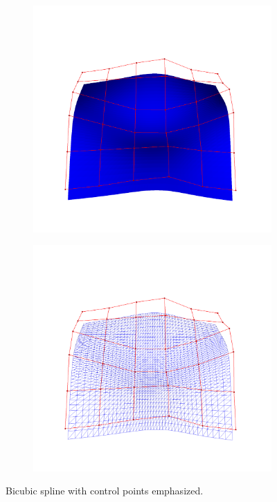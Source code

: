 \begin{figure}
    \centering
    \begin{subfigure}[b]{0.49\textwidth}
        \centering
        \includegraphics[height=\textwidth, trim=90 90 90 90, clip]{figures/registration/splines/spline2.png}
    \end{subfigure}

    \begin{subfigure}[b]{0.49\textwidth}
        \centering
        \includegraphics[height=\textwidth, trim=90 90 90 90, clip]{figures/registration/splines/spline3.png}
    \end{subfigure}
    \caption{Bicubic spline with control points emphasized.}
    \label{fig:spline}
\end{figure}